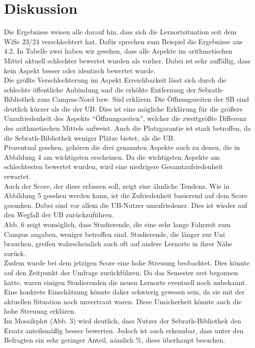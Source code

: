 \documentclass[11pt, a4paper]{article}
\begin{document}
\section{Diskussion}
Die Ergebnisse weisen alle darauf hin, dass sich die Lernortsituation seit dem WiSe 23/24 verschlechtert hat. Dafür sprechen zum Beispiel die Ergebnisse aus 4.2. In Tabelle zwei haben wir gesehen, dass alle Aspekte im arithmetischen Mittel aktuell schlechter bewertet wurden als vorher. Dabei ist sehr auffällig, dass kein Aspekt besser oder identisch bewertet wurde.\\
Die größte Verschlechterung im Aspekt Erreichbarkeit lässt sich durch die schlechte öffentliche Anbindung und die erhöhte Entfernung der Sebrath-Bibliothek zum Campus-Nord bzw. Süd erklären.  Die Öffnungszeiten der SB sind deutlich kürzer als die der UB. Dies ist eine mögliche Erklärung für die größere Unzufriedenheit des Aspekts “Öffnungszeiten”, welcher die zweitgrößte Differenz des arithmetischen Mittels aufweist. Auch die Platzgarantie ist stark betroffen, da die Sebrath-Bibliothek weniger Plätze bietet, als die UB. \\
Prozentual gesehen, gehören die drei genannten Aspekte auch zu denen, die in Abbildung 4 am wichtigsten erscheinen. Da die wichtigsten Aspekte am schlechtesten bewertet wurden, wird eine niedrigere Gesamtzufriedenheit erwartet.\\
Auch der Score, der diese erfassen soll, zeigt eine ähnliche Tendenz. Wie in Abbildung 5 gesehen werden kann, ist die Zufriedenheit basierend auf dem Score gesunken.
Dabei sind vor allem die UB-Nutzer unzufriedener. Dies ist wieder auf den Wegfall der UB zurückzuführen.\\
Abb. 6 zeigt womöglich, dass Studierende, die eine sehr lange Fahrzeit zum Campus angaben, weniger betroffen sind. Studierende, die länger zur Uni brauchen, greifen wahrscheinlich auch oft auf andere Lernorte in ihrer Nähe zurück. \\
Zudem wurde bei dem jetzigen Score eine hohe Streuung beobachtet. Dies könnte auf den Zeitpunkt der Umfrage zurückführen. Da das Semester erst begonnen hatte, waren einigen Studierenden die neuen Lernorte eventuell noch unbekannt. Eine konkrete Einschätzung könnte daher schwierig gewesen sein, da sie mit der aktuellen Situation noch unvertraut waren. Diese Unsicherheit könnte auch die hohe Streuung erklären.\\
Im Mosaikplot (Abb. 3) wird deutlich, dass Nutzer der Sebrath-Bibliothek den Ersatz anteilsmäßig besser bewerten. Jedoch ist auch erkennbar, dass unter den Befragten ein sehr geringer Anteil, nämlich \%, diese überhaupt besuchen.\\
\end{document}

